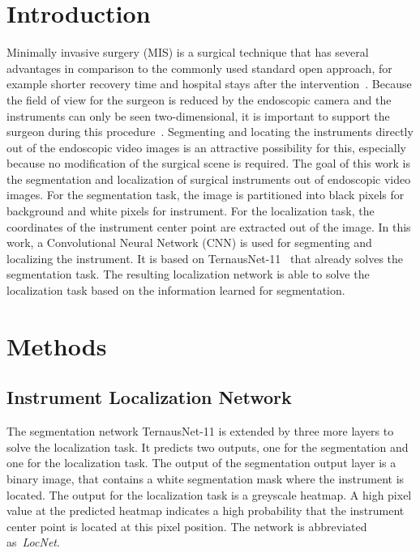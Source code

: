 \documentclass[conference]{IEEEtran}
\begin{document}

%
\IEEEpeerreviewmaketitle


\section{Introduction}
Minimally invasive surgery (MIS) is a surgical technique that has several advantages in comparison to the commonly used standard open approach, for example shorter recovery time and hospital stays after the intervention~\cite{laparoscp2002lacy}. %
Because the field of view for the surgeon is reduced by the endoscopic camera and the instruments can only be seen two-dimensional, it is important to support the surgeon during this procedure~\cite{detect_instruments_mis2013allan}. Segmenting and locating the instruments directly out of the endoscopic video images is an attractive possibility for this, especially because no modification of the surgical scene is required. 
The goal of this work is the segmentation and localization of surgical instruments out of endoscopic video images. For the segmentation task, the image is partitioned into black pixels for background and white pixels for instrument. For the localization task, the coordinates of the instrument center point are extracted out of the image. 
In this work, a Convolutional Neural Network (CNN) is used for segmenting and localizing the instrument. It is based on \mbox{TernausNet-11}~\cite{Shvets2018} that already solves the segmentation task. The resulting localization network is able to solve the localization task based on the information learned for segmentation. %


\section{Methods}

\subsection{Instrument Localization Network} 
The segmentation network TernausNet-11 is extended by three more layers to solve the localization task. It predicts two outputs, one for the segmentation and one for the localization task. 
The output of the segmentation output layer is a binary image, that contains a white segmentation mask
where the instrument is located. 
The output for the localization task is a greyscale heatmap. A high pixel
value at the predicted heatmap indicates a high probability that the instrument center point is located at this pixel position. The network is abbreviated as~\emph{LocNet}. %
\end{document}
